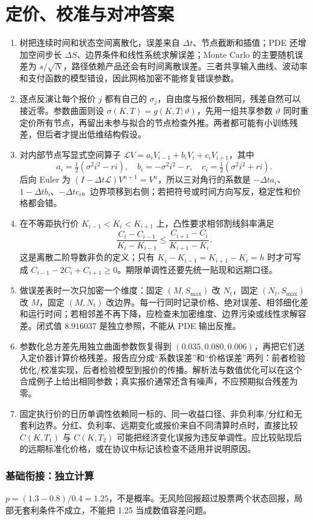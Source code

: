 \chapter{定价、校准与对冲答案}

\begin{enumerate}[leftmargin=*]
  \item 树把连续时间和状态空间离散化，误差来自 $\Delta t$、节点截断和插值；PDE 还增加空间步长 $\Delta S$、边界条件和线性系统求解误差；Monte Carlo 的主要随机误差为 $s/\sqrt N$，路径依赖产品还会有时间离散误差。三者共享输入曲线、波动率和支付函数的模型错设，因此网格加密不能修复错误参数。
  \item 逐点反演让每个报价 $j$ 都有自己的 $\sigma_j$，自由度与报价数相同，残差自然可以接近零。参数曲面则设 $\sigma(K,T)=g(K,T;\vartheta)$，先用一组共享参数 $\vartheta$ 同时重定价所有节点，再留出未参与拟合的节点检查外推。两者都可能有小训练残差，但后者才提出低维结构假设。
  \item 对内部节点写显式空间算子 $\mathcal L V=a_iV_{i-1}+b_iV_i+c_iV_{i+1}$，其中
  \[
  a_i=\tfrac12(\sigma^2i^2-ri),\quad b_i=-\sigma^2i^2-r,\quad c_i=\tfrac12(\sigma^2i^2+ri).
  \]
  后向 Euler 为 $(I-\Delta t\mathcal L)V^{n+1}=V^n$，所以三对角行的系数是 $-\Delta t a_i$、$1-\Delta t b_i$、$-\Delta t c_i$。边界项移到右侧；若把符号或时间方向写反，稳定性和价格都会错。
  \item 在不等距执行价 $K_{i-1}<K_i<K_{i+1}$ 上，凸性要求相邻割线斜率满足
  \[
  \frac{C_i-C_{i-1}}{K_i-K_{i-1}}\le
  \frac{C_{i+1}-C_i}{K_{i+1}-K_i}.
  \]
  这是离散二阶导数非负的定义；只有 $K_i-K_{i-1}=K_{i+1}-K_i=h$ 时才可写成 $C_{i-1}-2C_i+C_{i+1}\ge0$。期限单调性还要先统一贴现和远期口径。
  \item 做误差表时一次只加密一个维度：固定 $(M,S_{\max})$ 改 $N_t$，固定 $(N_t,S_{\max})$ 改 $M$，固定 $(M,N_t)$ 改边界。每一行同时记录价格、绝对误差、相邻细化差和运行时间；若相邻差不再下降，应检查未加密维度、边界污染或线性求解容差。闭式值 $8.916037$ 是独立参照，不能从 PDE 输出反推。
  \item 参数化总方差先用独立曲面参数恢复得到 $(0.035,0.080,0.006)$，再把它们送入定价器计算价格残差。报告应分成“系数误差”和“价格误差”两列：前者检验优化/校准实现，后者检验模型到报价的传播。解析法与数值优化可以在这个合成例子上给出相同参数；真实报价通常还含有噪声，不应预期拟合残差为零。
  \item 固定执行价的日历单调性依赖同一标的、同一收益口径、非负利率/分红和无套利边界。分红、负利率、远期变化或报价来自不同清算时点时，直接比较 $C(K,T_1)$ 与 $C(K,T_2)$ 可能把经济变化误报为违反单调性。应比较贴现后的远期标准化价格，或在协议中标记该检查不适用并说明原因。
\end{enumerate}

\subsection*{基础衔接：独立计算}
$p=(1.3-0.8)/0.4=1.25$，不是概率。无风险回报超过股票两个状态回报，局部无套利条件不成立，不能把 1.25 当成数值容差问题。



\MFQMappedDerivativesNumericsSolutions
